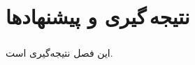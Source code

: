 
\chapter[نتیجه\,گیری و پیشنهادها]{\centering نتیجه\,گیری و پیشنهادها} \label{chapter:conclusion}

\paragraph*{}
این فصل نتیجه‌گیری است.
